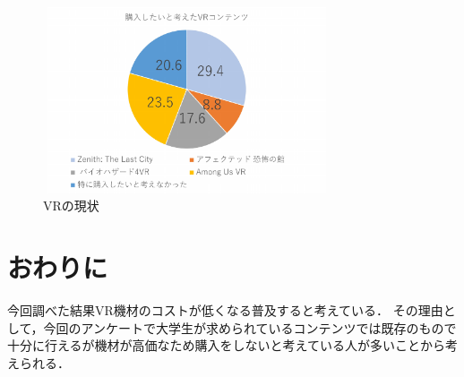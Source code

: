 \documentclass[twocolumn,10pt,a4j]{ltjsarticle}
\begin{document}
\begin{figure}[h]
\begin{center}
 \includegraphics[clip,width=85mm,height=55mm]{購入したいと考えたvrコンテンツ.pdf}
\end{center}
 \caption{VRの現状}
 \label{fig:購入したいと考えたvrコンテンツ.pdf}
\end{figure}

\section{おわりに}
今回調べた結果VR機材のコストが低くなる普及すると考えている．
その理由として，今回のアンケートで大学生が求められているコンテンツでは既存のもので十分に行えるが機材が高価なため購入をしないと考えている人が多いことから考えられる．

\end{document}
